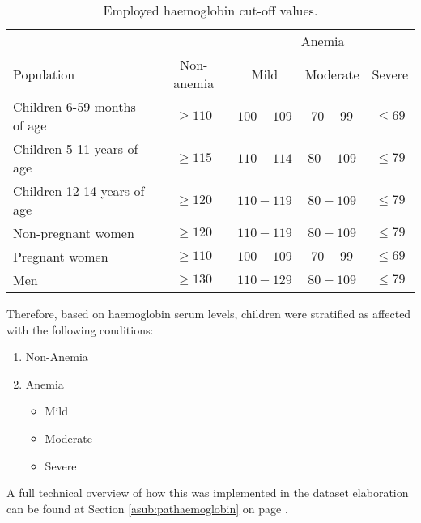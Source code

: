 \begin{table}[H]
   \centering
   \begin{tabular}{l c c c c}
   	  & & \multicolumn{3}{c}{Anemia\footnotemark[1]}\\
   	 \cline{3-5}
      Population & Non-anemia\footnotemark[1] & Mild\footnotemark[2] & Moderate & Severe\\
      \hline
      Children 6-59 months of age & $\geqslant 110$ & $100-109$ & $70-99$ & $\leqslant 69$\\
      Children 5-11 years of age & $\geqslant115$ & $110-114$ & $80-109$ & $\leqslant 79$\\
      Children 12-14 years of age & $\geqslant120$ & $110-119$ & $80-109$ & $\leqslant 79$\\
      Non-pregnant women & $\geqslant120$ & $110-119$ & $80-109$ & $\leqslant 79$\\
      Pregnant women & $\geqslant110$ & $100-109$ & $70-99$ & $\leqslant 69$\\
      Men & $\geqslant130$ & $110-129$ & $80-109$ & $\leqslant 79$\\
   \end{tabular}
   \caption{Employed haemoglobin cut-off values.}
    \label{tab:cutoffhaemo}
\end{table}


Therefore, based on haemoglobin serum levels, children were stratified as affected with the following conditions:
\begin{enumerate}
	\item Non-Anemia
	\item Anemia
	\begin{itemize}
		\item Mild\footnotemark[2]
		\item Moderate
		\item Severe
	\end{itemize}
\end{enumerate}

A full technical overview of how this was implemented in the dataset elaboration can be found at Section \ref{asub:pathaemoglobin} on page \pageref{asub:pathaemoglobin}.

